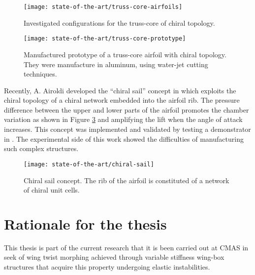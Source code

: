   \begin{figure}[!htpb]
    \centering
    \texttt{[image: state-of-the-art/truss-core-airfoils]}
    \caption[Investigated configurations for the truss-core of chiral topology]{Investigated configurations for the truss-core of chiral topology. \cite{Spadoni2007a}}\label{fig:truss-core-airfoil}
  \end{figure}

  \begin{figure}[!htpb]
    \centering
    \texttt{[image: state-of-the-art/truss-core-prototype]}
    \caption[Manufactured prototype of a truss-core airfoil with chiral topology]{Manufactured prototype of a truss-core airfoil with chiral topology. They were manufacture in aluminum, using water-jet cutting techniques. \cite{Spadoni2007b}}\label{fig:truss-core-prototype}
  \end{figure}

  Recently, A. Airoldi developed the ``chiral sail'' concept in \cite{Airoldi2012} which exploits the chiral topology of a chiral network embedded into the airfoil rib. The pressure difference between the upper and lower parts of the airfoil promotes the chamber variation as shown in Figure \ref{fig:chiral-sail} and amplifying the lift when the angle of attack increases. This concept was implemented and validated by testing a demonstrator in \cite{Airoldi2015a}. The experimental side of this work showed the difficulties of manufacturing such complex structures.

  \begin{figure}[!htpb]
    \centering
    \texttt{[image: state-of-the-art/chiral-sail]}
    \caption[Chiral sail concept]{Chiral sail concept. The rib of the airfoil is constituted of a network of chiral unit cells. \cite{Airoldi2012}}\label{fig:chiral-sail}
  \end{figure}  

\clearpage
\section{Rationale for the thesis} \label{sec:rationale_state}

  This thesis is part of the current research that it is been carried out at CMAS in seek of wing twist morphing achieved through variable stiffness wing-box structures that acquire this property undergoing elastic instabilities. 

